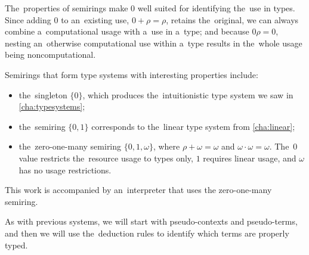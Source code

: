 The~properties of semirings make $0$ well suited for identifying the~use in
types. Since adding $0$ to an~existing use, $0 + \rho = \rho$, retains
the~original, we can always combine a~computational usage with a~use in a~type;
and because $0\rho = 0$, nesting an~otherwise computational use within a~type
results in the~whole usage being noncomputational.

Semirings that form type systems with interesting properties include:
\begin{itemize}
  \item the~singleton $\{0\}$, which produces the~intuitionistic type system we
    saw in \autoref{cha:typesystems};
  \item the~semiring $\{0, 1\}$ corresponds to the~linear type system from
    \autoref{cha:linear};
  \item the~zero-one-many semiring $\{0, 1, \omega\}$, where $\rho + \omega =
    \omega$ and $\omega \cdot \omega = \omega$. The~$0$ value restricts
    the~resource usage to types only, $1$ requires linear usage, and $\omega$
    has no usage restrictions.
\end{itemize}
This work is accompanied by an~interpreter that uses the zero-one-many semiring.


As with previous systems, we will start with pseudo-contexts and pseudo-terms,
and then we will use the~deduction rules to identify which terms are properly
typed.

